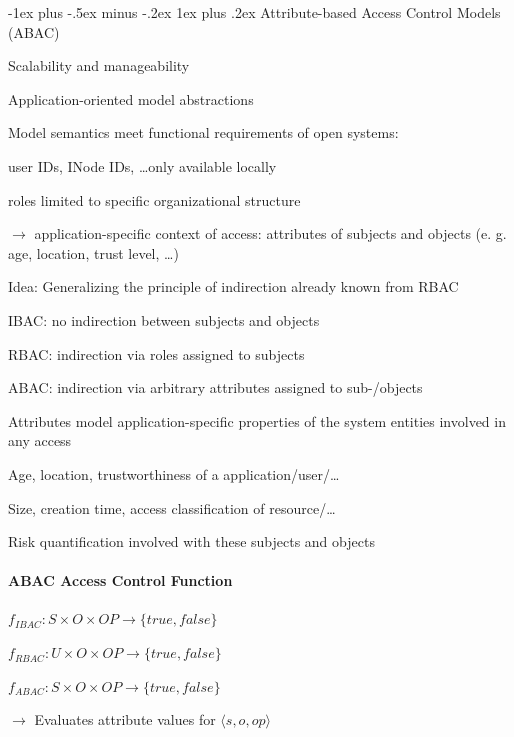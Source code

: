 \documentclass[a4paper]{article}
\makeatletter
\renewcommand{\subsubsection}{\@startsection{subsubsection}{3}{0mm}%
                {-1ex plus -.5ex minus -.2ex}%
                {1ex plus .2ex}%
                {\normalfont\small\bfseries}}
\makeatother
\begin{document}
\begin{multicols}{3}
    \subsubsection{Attribute-based Access Control Models (ABAC)}
    \begin{itemize*}
        \item Scalability and manageability
        \item Application-oriented model abstractions
        \item Model semantics meet functional requirements of open systems:
        \begin{itemize*}
            \item user IDs, INode IDs, \dots only available locally
            \item roles limited to specific organizational structure
        \end{itemize*}
        \item[$\rightarrow$] application-specific context of access: attributes of subjects and objects (e. g. age, location, trust level, \dots )
    \end{itemize*}

    Idea: Generalizing the principle of indirection already known from RBAC
    \begin{itemize*}
        \item IBAC: no indirection between subjects and objects
        \item RBAC: indirection via roles assigned to subjects
        \item ABAC: indirection via arbitrary attributes assigned to sub-/objects
        \item Attributes model application-specific properties of the system entities involved in any access
        \begin{itemize*}
            \item Age, location, trustworthiness of a application/user/\dots
            \item Size, creation time, access classification of resource/\dots
            \item Risk quantification involved with these subjects and objects
        \end{itemize*}
    \end{itemize*}

    \paragraph{ABAC Access Control Function}
    \begin{itemize*}
        \item $f_{IBAC}:S\times O\times OP\rightarrow\{true,false\}$
        \item $f_{RBAC}:U\times O\times OP\rightarrow\{true,false\}$
        \item $f_{ABAC}:S\times O\times OP\rightarrow\{true,false\}$
        \item[$\rightarrow$] Evaluates attribute values for $\langle s,o,op\rangle$
    \end{itemize*}


\end{multicols}
\end{document}

